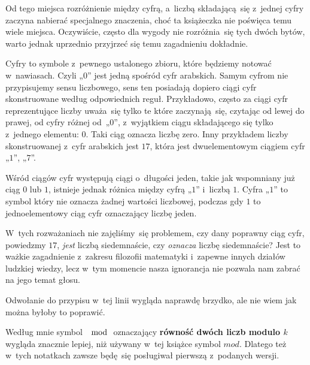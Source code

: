 \documentclass[a4paper,11pt]{article}
\numberwithin{equation}{section}
\begin{document}
\vspace{\spaceFour}





\noindent
{} Od tego miejsca rozróżnienie między cyfrą, a~liczbą składającą~się
z~jednej cyfry zaczyna nabierać specjalnego znaczenia, choć ta książeczka
nie poświęca temu wiele miejsca. Oczywiście, często dla wygody nie
rozróżnia~się tych dwóch bytów, warto jednak uprzednio przyjrzeć się temu
zagadnieniu dokładnie.

Cyfry to symbole z~pewnego ustalonego zbioru, które będziemy notować
w~nawiasach. Czyli „$0$” jest jedną spośród cyfr arabskich. Samym cyfrom
nie przypisujemy sensu liczbowego, sens ten posiadają dopiero ciągi cyfr
skonstruowane według odpowiednich reguł. Przykładowo, często za ciągi cyfr
reprezentujące liczby uważa~się tylko te które zaczynają~się, czytając od
lewej do prawej, od cyfry różnej od~„$0$”, z~wyjątkiem ciągu składającego
się tylko z~jednego elementu: $0$. Taki ciąg oznacza liczbę zero. Inny
przykładem liczby skonstruowanej z~cyfr arabskich jest $17$, która
jest dwuelementowym ciągiem cyfr „$1$”, „$7$”.

Wśród ciągów cyfr występują ciągi o~długości jeden, takie jak wspomniany już
ciąg $0$ lub $1$, istnieje jednak różnica między cyfrą „$1$” i~liczbą $1$.
Cyfra „$1$” to symbol który nie oznacza żadnej wartości liczbowej, podczas
gdy $1$ to jednoelementowy ciąg cyfr oznaczający liczbę jeden.

W~tych rozważaniach nie zajęliśmy~się problemem, czy dany poprawny ciąg
cyfr, powiedzmy $17$, \textit{jest} liczbą siedemnaście, czy
\textit{oznacza} liczbę siedemnaście? Jest to ważkie zagadnienie z~zakresu
filozofii matematyki i~zapewne innych działów ludzkiej wiedzy, lecz w~tym
momencie nasza ignorancja nie pozwala nam zabrać na jego temat głosu.

\vspace{\spaceFour}





\noindent
{} Odwołanie do przypisu w~tej linii wygląda naprawdę brzydko,
ale nie wiem jak można byłoby to poprawić.

\vspace{\spaceFour}





\noindent
{} Według mnie symbol $\mod$ oznaczający \textbf{równość dwóch liczb
  modulo $k$} wygląda znacznie lepiej, niż używany w~tej książce symbol
$mod$. Dlatego też w~tych notatkach zawsze będę~się posługiwał pierwszą
z~podanych wersji.
\end{document}
